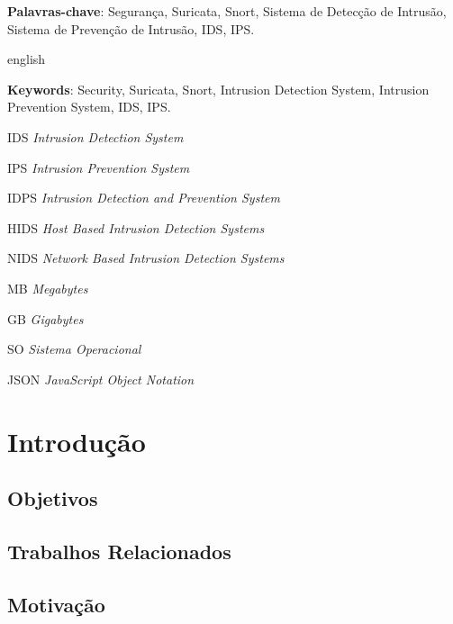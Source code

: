 \documentclass[
	12pt,				
	openright,		
	twoside,	
	a4paper,
	english,	
	brazil	
	]{abntex2}
\begin{document}
\setlength{\absparsep}{18pt} 
\begin{resumo}
 \textbf{Palavras-chave}: Segurança, Suricata, Snort, Sistema de Detecção de Intrusão, Sistema de Prevenção de Intrusão, IDS, IPS.
\end{resumo}
\begin{resumo}[Abstract]
 \begin{otherlanguage*}{english}
   \vspace{\onelineskip}
 
   \noindent 
   \textbf{Keywords}: Security, Suricata, Snort, Intrusion Detection System, Intrusion Prevention System, IDS, IPS.
 \end{otherlanguage*}
\end{resumo}
\listoffigures*
\cleardoublepage
{}
\listoftables*
\cleardoublepage
\begin{siglas}
  \item[IDS] \textit{Intrusion Detection System}
  \item[IPS] \textit{Intrusion Prevention System}
  \item[IDPS] \textit{Intrusion Detection and Prevention System}
  \item[HIDS] \textit{Host Based Intrusion Detection Systems}
  \item[NIDS] \textit{Network Based Intrusion Detection Systems}
  \item[MB] \textit{Megabytes}
  \item[GB] \textit{Gigabytes}
  \item[SO] \textit{Sistema Operacional}
  \item[JSON] \textit{JavaScript Object Notation}
\end{siglas}
\tableofcontents*
\cleardoublepage
\textual
\chapter*[Introdução]{Introdução}
\section*{Objetivos}
\section*{Trabalhos Relacionados}
\section*{Motivação}
\end{document}
